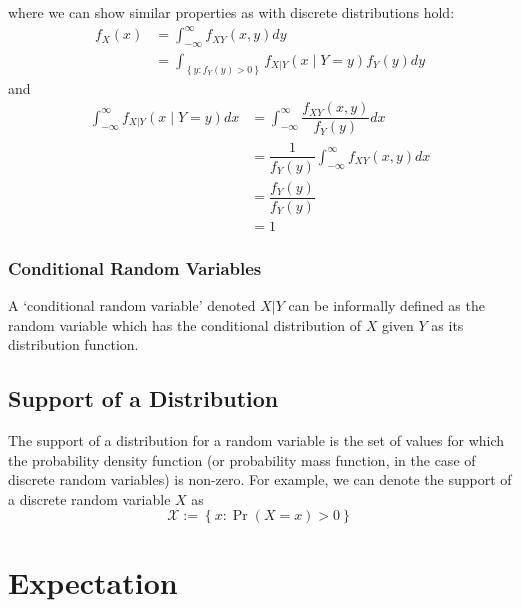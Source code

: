 \documentclass[11pt]{report} %
\begin{document}
where we can show similar properties as with discrete distributions hold:
\begin{align}
f_{X}\left(x\right) &= \int_{-\infty}^{\infty}f_{XY}\left(x, y\right)dy \\
&= \int_{\left\{y: f_{Y}\left(y\right) > 0\right\}}f_{X|Y}\left(x\middle|Y = y\right)f_{Y}\left(y\right)dy
\end{align}
and
\begin{align}
\int_{-\infty}^{\infty}f_{X|Y}\left(x\middle|Y = y\right)dx &= \int_{-\infty}^{\infty}\dfrac{f_{XY}\left(x, y\right)}{f_{Y}\left(y\right)}dx \\
&= \dfrac{1}{f_{Y}\left(y\right)}\int_{-\infty}^{\infty}f_{XY}\left(x, y\right)dx \\
&= \dfrac{f_{Y}\left(y\right)}{f_{Y}\left(y\right)} \\
&= 1
\end{align}

\subsubsection{Conditional Random Variables}

A `conditional random variable' denoted $X|Y$ can be informally defined as the random variable which has the conditional distribution of $X$ given $Y$ as its distribution function.

\subsection{Support of a Distribution}

The support of a distribution for a random variable is the set of values for which the probability density function (or probability mass function, in the case of discrete random variables) is non-zero. For example, we can denote the support of a discrete random variable $X$ as
\begin{equation}
\mathcal{X} := \left\{x: \operatorname{Pr}\left(X = x\right) > 0\right\}
\end{equation}

\section{Expectation}
\end{document}
